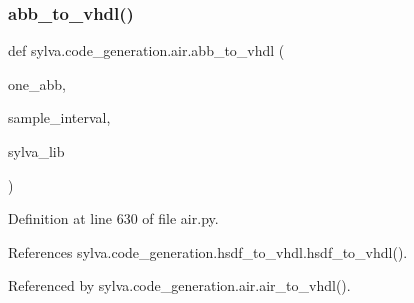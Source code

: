 \subsubsection{\texorpdfstring{abb\+\_\+to\+\_\+vhdl()}{abb\_to\_vhdl()}}
{\footnotesize\ttfamily def sylva.\+code\+\_\+generation.\+air.\+abb\+\_\+to\+\_\+vhdl (\begin{DoxyParamCaption}\item[{}]{one\+\_\+abb,  }\item[{}]{sample\+\_\+interval,  }\item[{}]{sylva\+\_\+lib }\end{DoxyParamCaption})}



Definition at line 630 of file air.\+py.



References sylva.\+code\+\_\+generation.\+hsdf\+\_\+to\+\_\+vhdl.\+hsdf\+\_\+to\+\_\+vhdl().



Referenced by sylva.\+code\+\_\+generation.\+air.\+air\+\_\+to\+\_\+vhdl().


